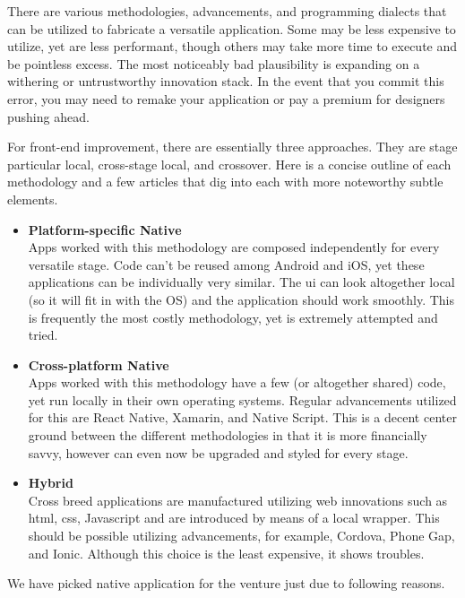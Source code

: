 There are various methodologies, advancements, and programming dialects that can be utilized to fabricate a versatile application. Some may be less expensive to utilize, yet are less performant, though others may take more time to execute and be pointless excess. The most noticeably bad plausibility is expanding on a withering or untrustworthy innovation stack. In the event that you commit this error, you may need to remake your application or pay a premium for designers pushing ahead.

For front-end improvement, there are essentially three approaches. They are stage particular local, cross-stage local, and crossover. Here is a concise outline of each methodology and a few articles that dig into each with more noteworthy subtle elements.

\begin{itemize}
  \item \textbf{Platform-specific Native} \\
  Apps worked with this methodology are composed independently for every versatile stage. Code can't be reused among Android and iOS, yet these applications can be individually very similar. The \gls{ui} can look altogether local (so it will fit in with the OS) and the application should work smoothly. This is frequently the most costly methodology, yet is extremely attempted and tried.
  
  \item \textbf{Cross-platform Native} \\ 
  Apps worked with this methodology have a few (or altogether shared) code, yet run locally in their own operating systems. Regular advancements utilized for this are React Native, Xamarin, and Native Script. This is a decent center ground between the different methodologies in that it is more financially savvy, however can even now be upgraded and styled for every stage.
  
  \item \textbf{Hybrid} \\
 Cross breed applications are manufactured utilizing web innovations such as \gls{html}, \gls{css}, Javascript and are introduced by means of a local wrapper. This should be possible utilizing advancements, for example, Cordova, Phone Gap, and Ionic. Although this choice is the least expensive, it shows troubles.
\end{itemize}

We have picked native application for the venture just due to following reasons.

